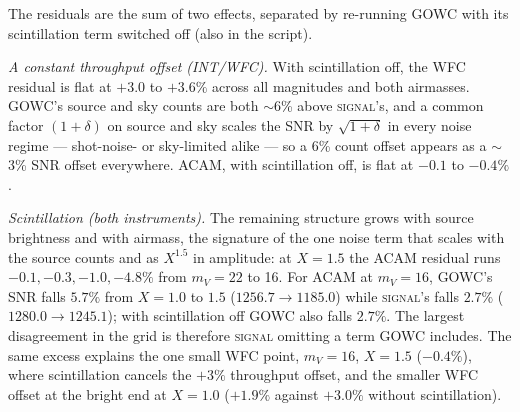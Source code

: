 \documentclass[11pt]{article}
\begin{document}
The residuals are the sum of two effects, separated by re-running GOWC with its
scintillation term switched off (also in the script).

\emph{A constant throughput offset (INT/WFC).} With scintillation off, the WFC
residual is flat at $+3.0$ to $+3.6\%$ across all magnitudes and both airmasses.
GOWC's source and sky counts are both $\sim$6\% above \textsc{signal}'s, and a common
factor $(1+\delta)$ on source and sky scales the SNR by $\sqrt{1+\delta}$ in every
noise regime --- shot-noise- or sky-limited alike --- so a 6\% count offset appears as
a $\sim$3\% SNR offset everywhere. ACAM, with scintillation off, is flat at $-0.1$ to
$-0.4\%$.

\emph{Scintillation (both instruments).} The remaining structure grows with source
brightness and with airmass, the signature of the one noise term that scales with
the source counts and as $X^{1.5}$ in amplitude: at $X=1.5$ the ACAM residual runs
$-0.1,-0.3,-1.0,-4.8\%$ from $m_V=22$ to 16. For ACAM at $m_V=16$, GOWC's SNR falls
$5.7\%$ from $X=1.0$ to $1.5$ ($1256.7\to1185.0$) while \textsc{signal}'s falls $2.7\%$
($1280.0\to1245.1$); with scintillation off GOWC also falls $2.7\%$. The largest
disagreement in the grid is therefore \textsc{signal} omitting a term GOWC includes.
The same excess explains the one small WFC point, $m_V=16$, $X=1.5$ ($-0.4\%$), where
scintillation cancels the $+3\%$ throughput offset, and the smaller WFC offset at the
bright end at $X=1.0$ ($+1.9\%$ against $+3.0\%$ without scintillation).
\end{document}
